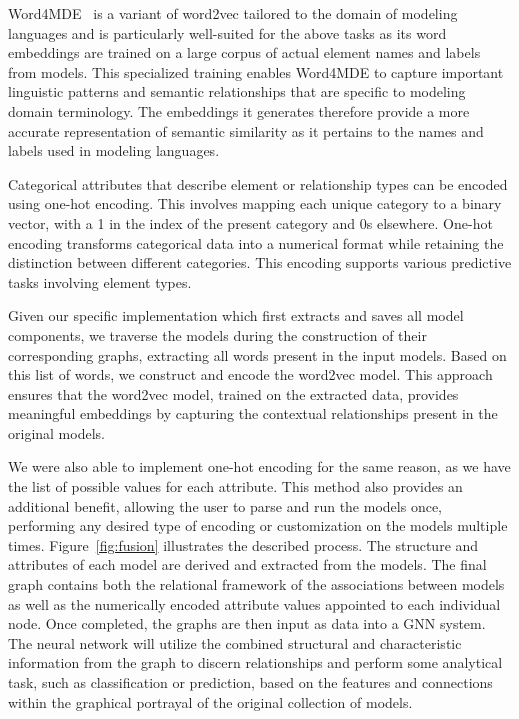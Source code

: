 \documentclass[journal,article,submit,moreauthors,technologies]{Definitions/mdpi}
\begin{document}
Word4MDE~\cite{lopez2023word} is a variant of word2vec tailored to the domain of modeling languages and is particularly well-suited for the above tasks as its word embeddings are trained on a large corpus of actual element names and labels from models. This specialized training enables Word4MDE to capture important linguistic patterns and semantic relationships that are specific to modeling domain terminology. The embeddings it generates therefore provide a more accurate representation of semantic similarity as it pertains to the names and labels used in modeling languages.

Categorical attributes that describe element or relationship types can be encoded using one-hot encoding. This involves mapping each unique category to a binary vector, with a 1 in the index of the present category and 0s elsewhere. One-hot encoding transforms categorical data into a numerical format while retaining the distinction between different categories. This encoding supports various predictive tasks involving element types.

Given our specific implementation which first extracts and saves all model components, we traverse the models during the construction of their corresponding graphs, extracting all words present in the input models. Based on this list of words, we construct and encode the word2vec model. This approach ensures that the word2vec model, trained on the extracted data, provides meaningful embeddings by capturing the contextual relationships present in the original models.

We were also able to implement one-hot encoding for the same reason, as we have the list of possible values for each attribute. This method also provides an additional benefit, allowing the user to parse and run the models once, performing any desired type of encoding or customization on the models multiple times.
Figure~\ref{fig:fusion} illustrates the described process. The structure and attributes of each model are derived and extracted from the models. The final graph contains both the relational framework of the associations between models as well as the numerically encoded attribute values appointed to each individual node. Once completed, the graphs are then input as data into a GNN system. The neural network will utilize the combined structural and characteristic information from the graph to discern relationships and perform some analytical task, such as classification or prediction, based on the features and connections within the graphical portrayal of the original collection of models.
\end{document}
